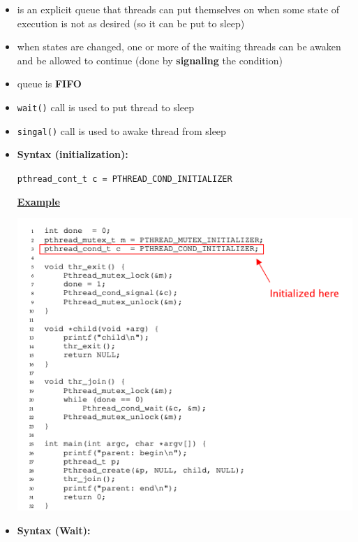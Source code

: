 \documentclass[12pt]{article}
\begin{document}
\begin{itemize}
    \item is an explicit queue that threads can put themselves on when some
    state of execution is not as desired (so it can be put to sleep)
    \item when states are changed, one or more of the waiting threads can be
    awaken and be allowed to continue (done by \textbf{signaling} the condition)
    \item queue is \textbf{FIFO}
    \item \texttt{wait()} call is used to put thread to sleep
    \item \texttt{singal()} call is used to awake thread from sleep
    \item \textbf{Syntax (initialization):}

    \bigskip

    \texttt{pthread\_cont\_t c = PTHREAD\_COND\_INITIALIZER}

    \bigskip

    \underline{\textbf{Example}}

    \begin{center}
    \includegraphics[width=\linewidth]{images/midterm_2_solution_16.png}
    \end{center}

    \item

    \textbf{Syntax (Wait):}

    \bigskip


\end{itemize}
\end{document}
